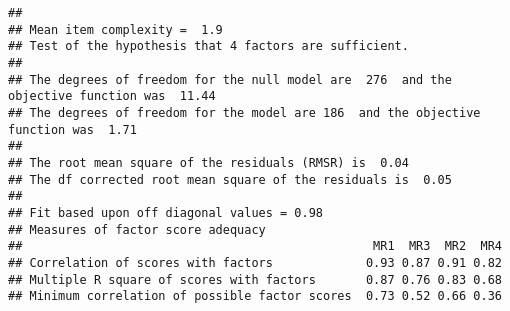 \documentclass[]{book}
\newenvironment{Shaded}{\begin{snugshade}}{\end{snugshade}}
\newcommand{\KeywordTok}[1]{\textcolor[rgb]{0.13,0.29,0.53}{\textbf{{#1}}}}
\newcommand{\DataTypeTok}[1]{\textcolor[rgb]{0.13,0.29,0.53}{{#1}}}
\newcommand{\DecValTok}[1]{\textcolor[rgb]{0.00,0.00,0.81}{{#1}}}
\newcommand{\StringTok}[1]{\textcolor[rgb]{0.31,0.60,0.02}{{#1}}}
\newcommand{\CommentTok}[1]{\textcolor[rgb]{0.56,0.35,0.01}{\textit{{#1}}}}
\newcommand{\NormalTok}[1]{{#1}}
\begin{document}
\begin{verbatim}
## 
## Mean item complexity =  1.9
## Test of the hypothesis that 4 factors are sufficient.
## 
## The degrees of freedom for the null model are  276  and the objective function was  11.44
## The degrees of freedom for the model are 186  and the objective function was  1.71 
## 
## The root mean square of the residuals (RMSR) is  0.04 
## The df corrected root mean square of the residuals is  0.05 
## 
## Fit based upon off diagonal values = 0.98
## Measures of factor score adequacy             
##                                                 MR1  MR3  MR2  MR4
## Correlation of scores with factors             0.93 0.87 0.91 0.82
## Multiple R square of scores with factors       0.87 0.76 0.83 0.68
## Minimum correlation of possible factor scores  0.73 0.52 0.66 0.36
\end{verbatim}

\begin{Shaded}
\end{Shaded}
\end{document}

